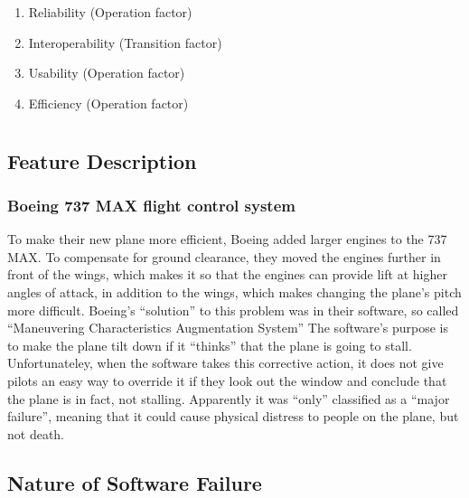 \documentclass[letterpaper]{article}
\begin{document}
\begin{enumerate}
	\item Reliability (Operation factor)
	\item Interoperability (Transition factor)
	\item Usability (Operation factor)
	\item Efficiency (Operation factor)
\end{enumerate}

\section{}


	\subsection*{Feature Description}
	\subsubsection*{Boeing 737 MAX flight control system}
	To make their new plane more efficient, Boeing added larger engines to the 737 MAX. 
	To compensate for ground clearance, they moved the engines further in front of the wings,
	which makes it so that the engines can provide lift at higher angles of attack, in addition to the wings, which makes
	changing the plane's pitch more difficult. Boeing's ``solution'' to this problem was in their software, 
	so called “Maneuvering Characteristics Augmentation System”\cite{ieeespectrum}
	The software's purpose is to make the plane tilt down if it ``thinks'' that the plane is going to stall. 
	Unfortunateley, when the software takes this corrective action, it does not give pilots an easy way to override it if
	they look out the window and conclude that the plane is in fact, not stalling. 	
	Apparently it was ``only'' classified as a ``major failure'', meaning that it could cause physical distress to people on the plane, but not death.\cite{gates_2019}

	\subsection*{Nature of Software Failure}
\end{document}
